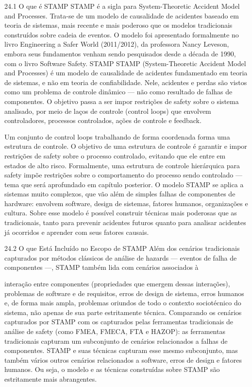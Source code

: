 24.1 O que é STAMP STAMP é a sigla para System-Theoretic Accident Model and Processes. Trata-se de um modelo de causalidade de acidentes baseado em teoria de sistemas, mais recente e mais poderoso que os modelos tradicionais construídos sobre cadeia de eventos. O modelo foi apresentado formalmente no livro Engineering a Safer World (2011/2012), da professora Nancy Leveson, embora seus fundamentos venham sendo pesquisados desde a década de 1990, com o livro Software Safety. STAMP STAMP (System-Theoretic Accident Model and Processes) é um modelo de causalidade de acidentes fundamentado em teoria de sistemas, e não em teoria de confiabilidade. Nele, acidentes e perdas são vistos como um problema de controle dinâmico — não como resultado de falhas de componentes. O objetivo passa a ser impor restrições de safety sobre o sistema analisado, por meio de laços de controle (control loops) que envolvem controladores, processos controlados, ações de controle e feedback.

Um conjunto de control loops trabalhando de forma coordenada forma uma estrutura de controle. O objetivo de uma estrutura de controle é garantir e impor restrições de safety sobre o processo controlado, evitando que ele entre em estados de alto risco. Formalmente, uma estrutura de controle hierárquica para safety impõe restrições sobre o comportamento do processo sendo controlado — tema que será aprofundado em capítulo posterior. O modelo STAMP se aplica a sistemas muito complexos, que vão além de simples falhas de componentes de hardware: envolvem software, design de sistemas, fatores humanos, organizações e cultura. Sobre esse modelo é possível construir técnicas mais poderosas que as tradicionais, tanto para prevenir acidentes futuros quanto para analisar acidentes já ocorridos e aprender com seus fatores causais.

24.2 O que Está Incluído no Escopo de STAMP Além dos cenários tradicionais capturados por métodos clássicos de análise de hazards — eventos de falha de componentes —, STAMP também lida com cenários associados à

interação entre componentes (propriedades que emergem dessas interações), problemas de software e de requisitos, erros de design de sistema, erros humanos e, de forma mais ampla, problemas oriundos de todo o contexto sociotécnico do sistema, não apenas de sua parte estritamente técnica. Comparando os cenários capturados por STAMP com os capturados pelas ferramentas tradicionais de análise de safety (como FMEA, FMECA, FTA e HAZOP): as ferramentas tradicionais capturam um subconjunto de cenários relacionados a falhas de componentes. STAMP e suas técnicas capturam esse mesmo subconjunto, mas também vários outros cenários relacionados a software, erros de design e fatores humanos. Ou seja, o modelo e as técnicas construídas sobre STAMP são estritamente mais abrangentes.

